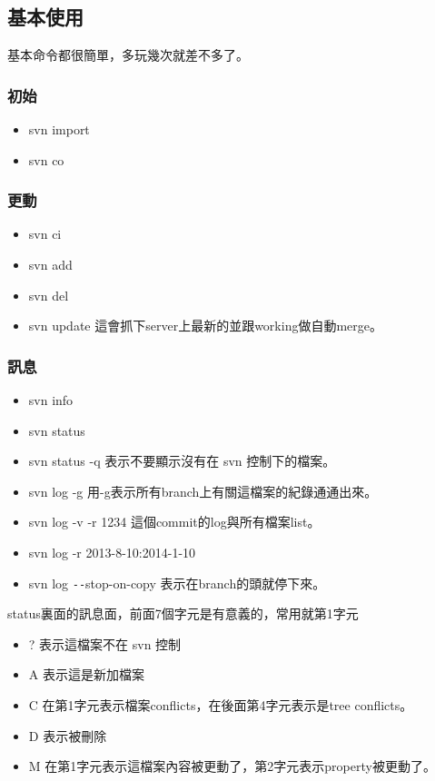   \subsection{基本使用}
  基本命令都很簡單，多玩幾次就差不多了。
  \subsubsection{初始}
  \begin{itemize}
    \item svn import
    \item svn co
  \end{itemize}
  \subsubsection{更動}
  \begin{itemize}
    \item svn ci
    \item svn add
    \item svn del
    \item svn update 這會抓下server上最新的並跟working做自動merge。
  \end{itemize}
  \subsubsection{訊息}
  \begin{itemize}
    \item svn info
    \item svn status
    \item svn status -q 表示不要顯示沒有在 svn 控制下的檔案。
    \item svn log -g 用-g表示所有branch上有關這檔案的紀錄通通出來。
    \item svn log -v -r 1234 這個commit的log與所有檔案list。
    \item svn log -r {2013-8-10}:{2014-1-10}
    \item svn log \verb=--=stop-on-copy 表示在branch的頭就停下來。
  \end{itemize}
  status裏面的訊息面，前面7個字元是有意義的，常用就第1字元
  \begin{itemize}
    \item ? 表示這檔案不在 svn 控制
    \item A 表示這是新加檔案
    \item C 在第1字元表示檔案conflicts，在後面第4字元表示是tree conflicts。
    \item D 表示被刪除
    \item M 在第1字元表示這檔案內容被更動了，第2字元表示property被更動了。
  \end{itemize}
